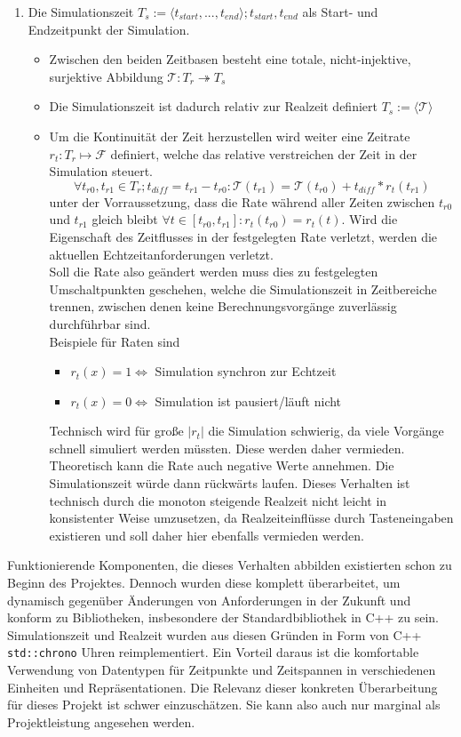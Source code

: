 \begin{enumerate}
\item Die Simulationszeit $T_s:=\langle t_{start}, ... , t_{end}\rangle; t_{start}, t_{end}$ als Start- und Endzeitpunkt der Simulation.
	\begin{itemize}
	\item Zwischen den beiden Zeitbasen besteht eine totale, nicht-injektive, surjektive Abbildung $\mathcal{T}:T_r \twoheadrightarrow T_s$
	\item Die Simulationszeit ist dadurch relativ zur Realzeit definiert $T_s:=\langle\mathcal{T}\rangle$
	\item Um die Kontinuität der Zeit herzustellen wird weiter eine Zeitrate $r_t:T_r\mapsto\mathcal{F}$ definiert, welche das relative verstreichen der Zeit in der Simulation steuert. 
	$$\forall t_{r0},  t_{r1} \in T_r ; t_{diff}=t_{r1}-t_{r0} :\mathcal{T}(t_{r1}) = \mathcal{T}(t_{r0}) + t_{diff}*r_t(t_{r1})$$ unter der Vorraussetzung, dass die Rate während aller Zeiten zwischen $t_{r0}$ und $t_{r1}$ gleich bleibt $\forall t \in [ t_{r0},t_{r1}]: r_t( t_{r0}) = r_t(t)$. Wird die Eigenschaft des Zeitflusses in der festgelegten Rate verletzt, werden die aktuellen Echtzeitanforderungen verletzt. \\
	Soll die Rate also geändert werden muss dies zu festgelegten Umschaltpunkten geschehen, welche die Simulationszeit in Zeitbereiche trennen, zwischen denen keine Berechnungsvorgänge zuverlässig durchführbar sind.\\
Beispiele für Raten sind 
\begin{itemize}
\item $r_t(x) = 1 \Leftrightarrow$ Simulation synchron zur Echtzeit
\item $r_t(x) = 0 \Leftrightarrow$ Simulation ist pausiert/läuft nicht
\end{itemize}
Technisch wird für große $|r_t|$ die Simulation schwierig, da viele Vorgänge schnell simuliert werden müssten. Diese werden daher vermieden.\\
Theoretisch kann die Rate auch negative Werte annehmen. Die Simulationszeit würde dann rückwärts laufen. Dieses Verhalten ist technisch durch die monoton steigende Realzeit nicht leicht in konsistenter Weise umzusetzen, da Realzeiteinflüsse durch Tasteneingaben existieren und soll daher hier ebenfalls vermieden werden.
	\end{itemize}
\end{enumerate}	

Funktionierende Komponenten, die dieses Verhalten abbilden existierten schon zu Beginn des Projektes. Dennoch wurden diese komplett überarbeitet, um dynamisch gegenüber Änderungen von Anforderungen in der Zukunft und konform zu Bibliotheken, insbesondere der Standardbibliothek in C++ zu sein. Simulationszeit und Realzeit wurden aus diesen Gründen in Form von C++ \texttt{std::chrono} Uhren reimplementiert. Ein Vorteil daraus ist die komfortable Verwendung von Datentypen für Zeitpunkte und Zeitspannen in verschiedenen Einheiten und Repräsentationen. Die Relevanz dieser konkreten Überarbeitung für dieses Projekt ist schwer einzuschätzen. Sie kann also auch nur marginal als Projektleistung angesehen werden.


